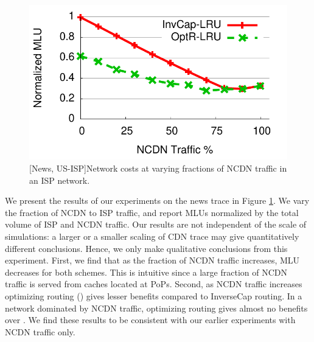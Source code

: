 \begin{figure}
\begin{center}
\includegraphics[scale=0.4]{graphset1/ispncdn/ATTNews-99percentile.pdf}
\vspace{-0.25in}
\end{center}
\caption{[News, US-ISP]Network costs at varying fractions of NCDN traffic in an ISP network.}
\label{fig:ispncdn}
\vspace{-0.2in}
\end{figure}

We present the results of our experiments on the news trace in Figure \ref{fig:ispncdn}. We vary the fraction of NCDN to ISP traffic, and report MLUs normalized by the total volume of ISP and NCDN traffic.
Our results are not independent of the scale of simulations: a larger or a smaller scaling of CDN trace may give quantitatively different conclusions. Hence, we only make qualitative conclusions from this experiment. First, we find that as the fraction of NCDN traffic increases, MLU decreases for both schemes. This is intuitive since a large fraction of NCDN traffic is served from caches located at PoPs. Second, as NCDN traffic increases optimizing routing (\optlru) gives lesser benefits compared to InverseCap routing.  In a network dominated by NCDN traffic, optimizing routing gives almost no benefits over \invlru. We find these results to be consistent with our earlier experiments with NCDN traffic only.


